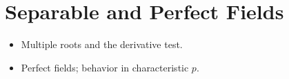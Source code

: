 \section{Separable and Perfect Fields}
\begin{itemize}
  \item Multiple roots and the derivative test.
  \item Perfect fields; behavior in characteristic $p$.
\end{itemize}
